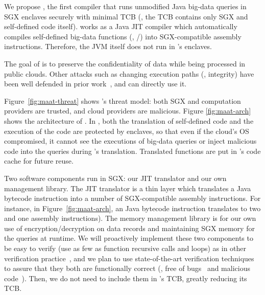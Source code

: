 We propose \maat, the first compiler that runs unmodified Java big-data queries 
in SGX enclaves securely with minimal TCB (\ie, the TCB contains only SGX and 
self-defined code itself). \maat works as a Java JIT compiler which 
automatically compiles self-defined big-data functions (\eg, 
/) into SGX-compatible assembly instructions. 
Therefore, the 
JVM itself does not run in \maat's enclaves.

The goal of \maat is to preserve the confidentiality of data while being 
processed in public clouds. Other attacks such as changing execution paths 
(\ie, integrity) have been well defended in prior work~\cite{jitguard:ccs17}, 
and \maat can directly use it.

Figure~\ref{fig:maat-threat} shows \maat's threat model: both SGX and 
computation providers are trusted, and cloud providers are malicious. Figure 
\ref{fig:maat-arch} shows the architecture of \maat. In \maat, both the 
translation of self-defined code and the execution of the code are protected by 
enclaves, so that even if the cloud's OS compromised, it cannot see the 
executions of big-data queries or inject malicious code into the queries during 
\maat's translation. Translated functions are put in \maat's code cache for 
future reuse.

Two \maat software components run in SGX: our JIT translator 
and our own management library. The JIT translator is a thin layer which 
translates a Java bytecode instruction into a number of SGX-compatible 
assembly instructions. For instance, in Figure~\ref{fig:maat-arch}, an 
 Java bytecode instruction translates to two  and one 
 assembly instructions). The memory management library is for our own 
use of encryption/decryption on data records and maintaining SGX memory for the 
queries at runtime. We will proactively implement these two components to be 
easy to verify (use as few as function recursive calls and loops) as in other 
verification practice~\cite{xi:sosp17}, and we plan to use state-of-the-art 
verification techniques~\cite{xi:sosp17} to assure that they both are 
functionally correct (\ie, free of bugs~\cite{xi:sosp17} and 
malicious code~\cite{adelstein2002malicious}). Then, we do not 
need to include them in \maat's TCB, greatly reducing its TCB.


